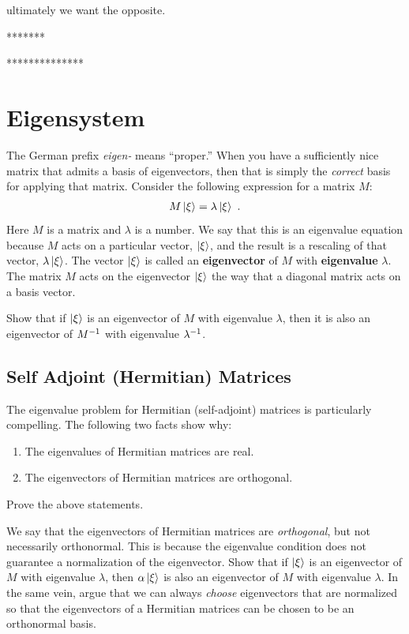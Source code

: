 \documentclass[12pt, oneside]{report}    %
\let\oldsection\section
\def\section{%
  \setcounter{sidenote}{1}%
  \oldsection
}
\begin{document}
ultimately we want the opposite.

*******



**************


\section{Eigensystem}
\label{sec:eigensystem}

The German prefix \emph{eigen-} means ``proper.'' When you have a sufficiently nice matrix that admits a basis of eigenvectors, then that is simply the \emph{correct} basis for applying that matrix. Consider the following expression for a matrix $M$:
\begin{align}
    M\left|\xi\right\rangle = \lambda\left|\xi\right\rangle \ .
\end{align}
Here $M$ is a matrix and $\lambda$ is a number. We say that this is an eigenvalue equation because $M$ acts on a particular vector, $\left|\xi\right\rangle$, and the result is a rescaling of that vector, $\lambda\left|\xi\right\rangle$. The vector $\left|\xi\right\rangle$ is called an \textbf{eigenvector} of $M$ with \textbf{eigenvalue} $\lambda$.  The matrix $M$ acts on the eigenvector $\left|\xi\right\rangle$ the way that a diagonal matrix acts on a basis vector.
 
\begin{exercise}
Show that if $\left|\xi\right\rangle$ is an eigenvector of $M$ with eigenvalue $\lambda$, then it is also an eigenvector of $M^{-1}$ with eigenvalue $\lambda^{-1}$. 
\end{exercise}

\subsection{Self Adjoint (Hermitian) Matrices}

The eigenvalue problem for Hermitian (self-adjoint) matrices is particularly compelling. The following two facts show why:
\begin{enumerate}
    \item The eigenvalues of Hermitian matrices are real.
    \item The eigenvectors of Hermitian matrices are orthogonal.
\end{enumerate}

\begin{exercise}
Prove the above statements. 
\end{exercise}

\begin{exercise}\label{ex:orthogonal:eigenvectors:not:normal}
We say that the eigenvectors of Hermitian matrices are \emph{orthogonal}, but not necessarily orthonormal. This is because the eigenvalue condition does not guarantee a normalization of the eigenvector. Show that if $\left|\xi\right\rangle$ is an eigenvector of $M$ with eigenvalue $\lambda$, then $\alpha\left|\xi\right\rangle$ is also an eigenvector of $M$ with eigenvalue $\lambda$. In the same vein, argue that we can always \emph{choose} eigenvectors that are normalized so that the eigenvectors of a Hermitian matrices can be chosen to be an orthonormal basis.
\end{exercise}
\end{document}
